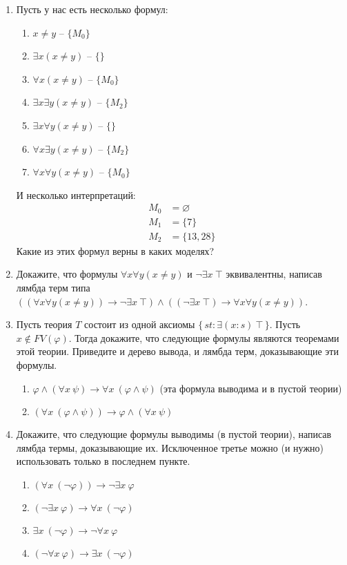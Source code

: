 \begin{enumerate}
\item Пусть у нас есть несколько формул:
\begin{enumerate}
\item \label{it:no} $x \neq y$ -- $\{M_0\}$
\item \label{it:e} $\exists x (x \neq y)$ -- $\{\}$
\item \label{it:a} $\forall x (x \neq y)$ -- $\{M_0\}$
\item \label{it:ee} $\exists x \exists y (x \neq y)$ -- $\{M_2\}$
\item \label{it:ea} $\exists x \forall y (x \neq y)$ -- $\{\}$
\item \label{it:ae} $\forall x \exists y (x \neq y)$ -- $\{M_2\}$
\item \label{it:aa} $\forall x \forall y (x \neq y)$ -- $\{M_0\}$
\end{enumerate}
И несколько интерпретаций:
\begin{align*}
M_0 & = \varnothing \\
M_1 & = \{ 7 \} \\
M_2 & = \{ 13, 28 \}
\end{align*}
Какие из этих формул верны в каких моделях?

\item Докажите, что формулы $\forall x \forall y (x \neq y)$ и $\neg \exists x\ \top$ эквивалентны,
    написав лямбда терм типа $((\forall x \forall y (x \neq y)) \to \neg \exists x\ \top) \land ((\neg \exists x\ \top) \to \forall x \forall y (x \neq y))$.

\item Пусть теория $T$ состоит из одной аксиомы $\{\,st : \exists (x : s)\ \top\,\}$.
    Пусть $x \notin FV(\varphi)$.
    Тогда докажите, что следующие формулы являются теоремами этой теории.
    Приведите и дерево вывода, и лямбда терм, доказывающие эти формулы.
\begin{enumerate}
\item $\varphi \land (\forall x\ \psi) \to \forall x\ (\varphi \land \psi)$ (эта формула выводима и в пустой теории)
\item $(\forall x\ (\varphi \land \psi)) \to \varphi \land (\forall x\ \psi)$
\end{enumerate}

\item Докажите, что следующие формулы выводимы (в пустой теории), написав лямбда термы, доказывающие их.
    Исключенное третье можно (и нужно) использовать только в последнем пункте.
\begin{enumerate}
\item $(\forall x\ (\neg \varphi)) \to \neg \exists x\ \varphi$
\item $(\neg \exists x\ \varphi) \to \forall x\ (\neg \varphi)$
\item $\exists x\ (\neg \varphi) \to \neg \forall x\ \varphi$
\item $(\neg \forall x\ \varphi) \to \exists x\ (\neg \varphi)$
\end{enumerate}

\end{enumerate}

